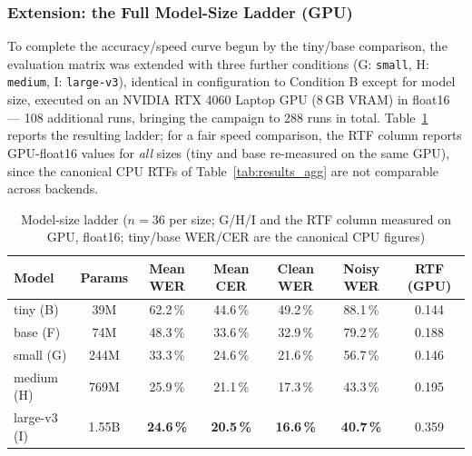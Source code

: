 \documentclass[12pt]{report}
\begin{document}
\subsubsection*{Extension: the Full Model-Size Ladder (GPU)}
To complete the accuracy/speed curve begun by the tiny/base comparison, the evaluation matrix was extended with three further conditions (G: \texttt{small}, H: \texttt{medium}, I: \texttt{large-v3}), identical in configuration to Condition B except for model size, executed on an NVIDIA RTX 4060 Laptop GPU (8\,GB VRAM) in float16 --- 108 additional runs, bringing the campaign to 288 runs in total. Table~\ref{tab:ladder} reports the resulting ladder; for a fair speed comparison, the RTF column reports GPU-float16 values for \emph{all} sizes (tiny and base re-measured on the same GPU), since the canonical CPU RTFs of Table~\ref{tab:results_agg} are not comparable across backends.
\begin{table}[H]
\centering
\small
\begin{tabular}{|l|c|c|c|c|c|c|}
\hline
\textbf{Model} & \textbf{Params} & \textbf{Mean WER} & \textbf{Mean CER} & \textbf{Clean WER} & \textbf{Noisy WER} & \textbf{RTF (GPU)} \\ \hline
tiny (B) & 39M & 62.2\,\% & 44.6\,\% & 49.2\,\% & 88.1\,\% & 0.144 \\ \hline
base (F) & 74M & 48.3\,\% & 33.6\,\% & 32.9\,\% & 79.2\,\% & 0.188 \\ \hline
small (G) & 244M & 33.3\,\% & 24.6\,\% & 21.6\,\% & 56.7\,\% & 0.146 \\ \hline
medium (H) & 769M & 25.9\,\% & 21.1\,\% & 17.3\,\% & 43.3\,\% & 0.195 \\ \hline
large-v3 (I) & 1.55B & \textbf{24.6\,\%} & \textbf{20.5\,\%} & \textbf{16.6\,\%} & \textbf{40.7\,\%} & 0.359 \\ \hline
\end{tabular}
\caption{Model-size ladder ($n=36$ per size; G/H/I and the RTF column measured on GPU, float16; tiny/base WER/CER are the canonical CPU figures)}
\label{tab:ladder}
\end{table}
\end{document}
